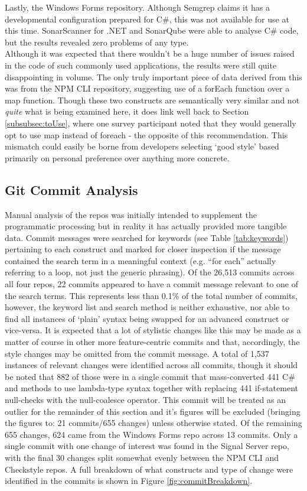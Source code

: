 \documentclass{article}
\begin{document}
            Lastly, the Windows Forms repository. Although Semgrep claims it has a developmental configuration prepared for C\#, this was not available for use at this time. SonarScanner for .NET and SonarQube were able to analyse C\# code, but the results revealed zero problems of any type.
            \\
            Although it was expected that there wouldn't be a huge number of issues raised in the code of such commonly used applications, the results were still quite disappointing in volume. The only truly important piece of data derived from this was from the NPM CLI repository, suggesting use of a forEach function over a map function. Though these two constructs are semantically very similar and not \emph{quite} what is being examined here, it does link well back to Section \ref{subsubsec:toUse}, where one survey participant noted that they would generally opt to use map instead of foreach - the opposite of this recommendation. This mismatch could easily be borne from developers selecting `good style' based primarily on personal preference over anything more concrete.
    \subsection{Git Commit Analysis}
    \label{subsec:commitAnalysis}
        Manual analysis of the repos was initially intended to supplement the programmatic processing but in reality it has actually provided more tangible data. Commit messages were searched for keywords (see Table \ref{tab:keywords}) pertaining to each construct and marked for closer inspection if the message contained the search term in a meaningful context (e.g. ``for each'' actually referring to a loop, not just the generic phrasing). Of the 26,513 commits across all four repos, 22 commits appeared to have a commit message relevant to one of the search terms. This represents less than 0.1\% of the total number of commits, however, the keyword list and search method is neither exhaustive, nor able to find all instances of `plain' syntax being swapped for an advanced construct or vice-versa. It is expected that a lot of stylistic changes like this may be made as a matter of course in other more feature-centric commits and that, accordingly, the style changes may be omitted from the commit message. A total of 1,537 instances of relevant changes were identified across all commits, though it should be noted that 882 of those were in a single commit that mass-converted 441 C\#  and  methods to use lambda-type syntax together with replacing 441 if-statement null-checks with the null-coalesce operator. This commit will be treated as an outlier for the remainder of this section and it's figures will be excluded (bringing the figures to: 21 commits/655 changes) unless otherwise stated. Of the remaining 655 changes, 624 came from the Windows Forms repo across 13 commits. Only a single commit with one change of interest was found in the Signal Server repo, with the final 30 changes split somewhat evenly between the NPM CLI and Checkstyle repos. A full breakdown of what constructs and type of change were identified in the commits is shown in Figure \ref{fig:commitBreakdown}.
\end{document}

